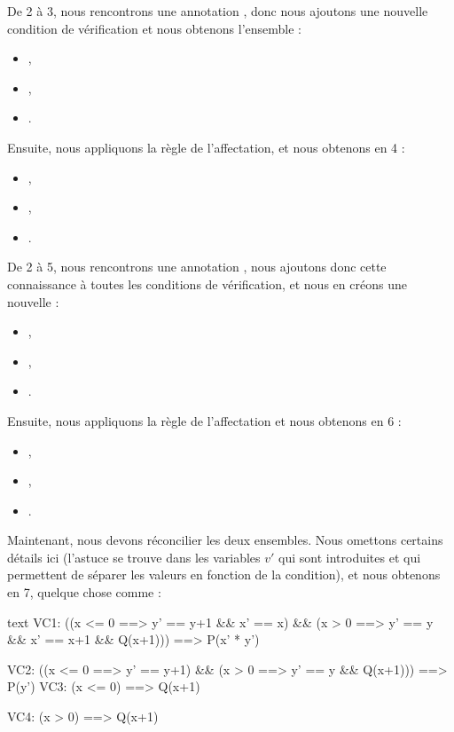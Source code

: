 De 2 à 3, nous rencontrons une annotation , donc nous ajoutons
une nouvelle condition de vérification et nous obtenons l'ensemble :
\begin{itemize}
  \item {},
  \item {},
  \item {}.
\end{itemize}
Ensuite, nous appliquons la règle de l'affectation, et nous obtenons en 4 :
\begin{itemize}
  \item {},
  \item {},
  \item {}.
\end{itemize}


De 2 à 5, nous rencontrons une annotation , nous ajoutons
donc cette connaissance à toutes les conditions de vérification, et nous en
créons une nouvelle :
\begin{itemize}
  \item {},
  \item {},
  \item {}.
\end{itemize}
Ensuite, nous appliquons la règle de l'affectation et nous obtenons en 6 :
\begin{itemize}
  \item {},
  \item {},
  \item {}.
\end{itemize}


Maintenant, nous devons réconcilier les deux ensembles. Nous omettons certains
détails ici (l'astuce se trouve dans les variables $v'$ qui sont introduites et
qui permettent de séparer les valeurs en fonction de la condition), et nous
obtenons en 7, quelque chose comme :
\begin{CodeBlock}{text}
  VC1:
    ((x <= 0 ==> y' == y+1 && x' == x) &&
     (x >  0 ==> y' == y   && x' == x+1 && Q(x+1))) ==>
       P(x' * y')

  VC2:
    ((x <= 0 ==> y' == y+1) &&
     (x >  0 ==> y' == y    && Q(x+1))) ==>
       P(y')
  VC3:
    (x <= 0) ==> Q(x+1)

  VC4:
    (x >  0) ==> Q(x+1)
\end{CodeBlock}


